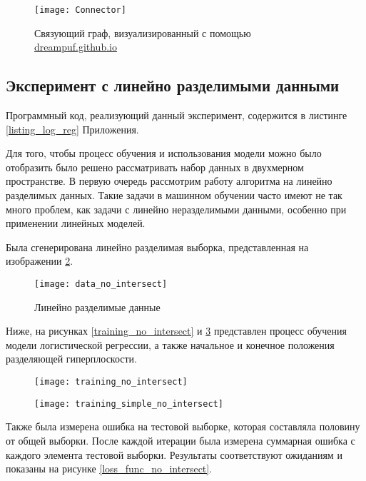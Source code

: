 \begin{figure}[h]
    \centering
    \texttt{[image: Connector]}
    \caption{Связующий граф, визуализированный с помощью \href{https://dreampuf.github.io/GraphvizOnline}{dreampuf.github.io}}
    \label{Connector}
\end{figure}

\subsection{Эксперимент с линейно разделимыми данными}
Программный код, реализующий данный эксперимент, содержится в листинге \ref{listing_log_reg} Приложения.

Для того, чтобы процесс обучения и использования модели можно было отобразить было решено рассматривать набор данных в двухмерном пространстве. В первую очередь рассмотрим работу алгоритма на линейно разделимых данных. Такие задачи в машинном обучении часто имеют не так много проблем, как задачи с линейно неразделимыми данными, особенно при применении линейных моделей.

Была сгенерирована линейно разделимая выборка, представленная на изображении \ref{data_no_intersect}.

\begin{figure}[h]
    \centering
    \texttt{[image: data\_no\_intersect]}
    \caption{Линейно разделимые данные}
    \label{data_no_intersect}
\end{figure}

Ниже, на рисунках \ref{training_no_intersect} и \ref{training_simple_no_intersect} представлен процесс обучения модели логистической регрессии, а также начальное и конечное положения разделяющей гиперплоскости.

\begin{figure}
\centering
\begin{minipage}{.5\textwidth}
  \centering
  \texttt{[image: training\_no\_intersect]}
  \label{training_no_intersect}
\end{minipage}%
\begin{minipage}{.5\textwidth}
  \centering
  \texttt{[image: training\_simple\_no\_intersect]}
  \label{training_simple_no_intersect}
\end{minipage}
\end{figure}

\clearpage
Также была измерена ошибка на тестовой выборке, которая составляла половину от общей выборки. После каждой итерации была измерена суммарная ошибка с каждого элемента тестовой выборки. Результаты соответствуют ожиданиям и показаны на рисунке \ref{loss_func_no_intersect}.

